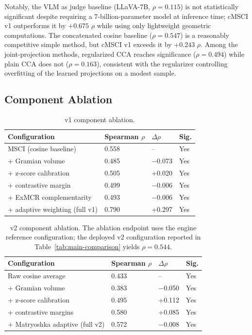 \documentclass[a4paper,fleqn]{cas-sc}
\begin{document}
\begin{itemize}
Notably, the VLM as judge baseline (LLaVA-7B, $\rho = 0.115$) is not statistically significant despite requiring a 7-billion-parameter model at inference time; cMSCI v1 outperforms it by $+0.675$ $\rho$ while using only lightweight geometric computations. The concatenated cosine baseline ($\rho = 0.547$) is a reasonably competitive simple method, but cMSCI v1 exceeds it by $+0.243$ $\rho$. Among the joint-projection methods, regularized CCA reaches significance ($\rho = 0.494$) while plain CCA does not ($\rho = 0.163$), consistent with the regularizer controlling overfitting of the learned projections on a modest sample.

\subsection{Component Ablation}\label{sec:ablation}

\begin{table}[t]
\caption{v1 component ablation.}\label{tab:v1-ablation}
\centering
\begin{tabular}{llll}
\toprule
Configuration & Spearman $\rho$ & $\Delta\rho$ & Sig. \\
\midrule
MSCI (cosine baseline) & 0.558 & -- & Yes \\
+ Gramian volume & 0.485 & $-$0.073 & Yes \\
+ z-score calibration & 0.505 & +0.020 & Yes \\
+ contrastive margin & 0.499 & $-$0.006 & Yes \\
+ ExMCR complementarity & 0.493 & $-$0.006 & Yes \\
+ adaptive weighting (full v1) & 0.790 & +0.297 & Yes \\
\bottomrule
\end{tabular}
\end{table}

\begin{table}[t]
\caption{v2 component ablation. The ablation endpoint uses the engine reference configuration; the deployed v2 configuration reported in Table~\ref{tab:main-comparison} yields $\rho = 0.544$.}\label{tab:v2-ablation}
\centering
\begin{tabular}{llll}
\toprule
Configuration & Spearman $\rho$ & $\Delta\rho$ & Sig. \\
\midrule
Raw cosine average & 0.433 & -- & Yes \\
+ Gramian volume & 0.383 & $-$0.050 & Yes \\
+ z-score calibration & 0.495 & +0.112 & Yes \\
+ contrastive margins & 0.580 & +0.085 & Yes \\
+ Matryoshka adaptive (full v2) & 0.572 & $-$0.008 & Yes \\
\bottomrule
\end{tabular}
\end{table}


\end{itemize}
\end{document}
